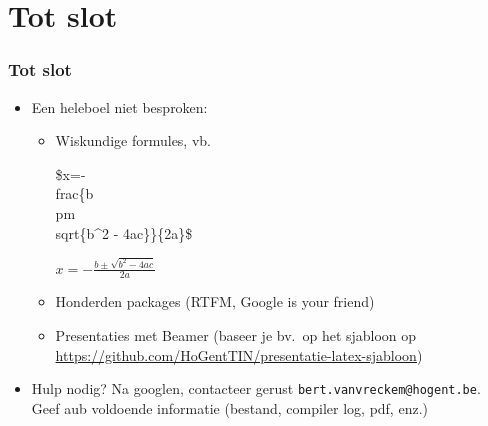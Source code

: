 \documentclass[aspectratio=169]{beamer}
\begin{document}
\section{Tot slot}

\begin{frame}[fragile]
 \frametitle{Tot slot}

 \begin{itemize}
   \item Een heleboel niet besproken:
   \begin{itemize}
     \item<+-> Wiskundige formules, vb.
     \begin{semiverbatim}
       \$x=-\\frac\{b \\pm \\sqrt\{b\^{}2 - 4ac\}\}\{2a\}\$
     \end{semiverbatim}
     \(x=-\frac{b \pm \sqrt{b^2 - 4ac}}{2a}\)
     \item<+-> Honderden packages (RTFM, Google is your friend)
     \item<+-> Presentaties met Beamer (baseer je bv.\ op het sjabloon op \url{https://github.com/HoGentTIN/presentatie-latex-sjabloon})

   \end{itemize}
   \item<+-> Hulp nodig? Na googlen, contacteer gerust \texttt{bert.vanvreckem@hogent.be}. Geef aub voldoende informatie (bestand, compiler log, pdf, enz.)
 \end{itemize}
\end{frame}
\end{document}
